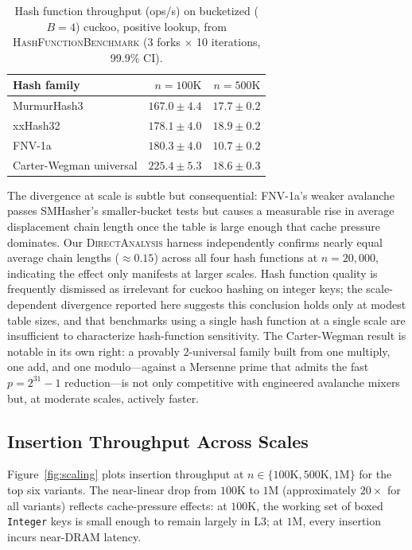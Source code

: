 \documentclass[10pt,journal,compsoc]{IEEEtran}
\begin{document}
\begin{table}[h]
\centering
\caption{Hash function throughput (ops/s) on bucketized ($B=4$) cuckoo, positive lookup, from \textsc{HashFunctionBenchmark} (3 forks $\times$ 10 iterations, 99.9\% CI).}
\label{tab:hashfunc}
\begin{tabular}{@{}lrr@{}}
\toprule
Hash family & $n=100\mathrm{K}$ & $n=500\mathrm{K}$ \\
\midrule
MurmurHash3              & $167.0 \pm 4.4$ & $17.7 \pm 0.2$ \\
xxHash32                 & $178.1 \pm 4.0$ & $18.9 \pm 0.2$ \\
FNV-1a                   & $180.3 \pm 4.0$ & $\mathbf{10.7 \pm 0.2}$ \\
Carter-Wegman universal  & $\mathbf{225.4 \pm 5.3}$ & $18.6 \pm 0.3$ \\
\bottomrule
\end{tabular}
\end{table}

The divergence at scale is subtle but consequential: FNV-1a's weaker avalanche passes SMHasher's smaller-bucket tests but causes a measurable rise in average displacement chain length once the table is large enough that cache pressure dominates. Our \textsc{DirectAnalysis} harness independently confirms nearly equal average chain lengths ($\approx 0.15$) across all four hash functions at $n=20{,}000$, indicating the effect only manifests at larger scales. Hash function quality is frequently dismissed as irrelevant for cuckoo hashing on integer keys; the scale-dependent divergence reported here suggests this conclusion holds only at modest table sizes, and that benchmarks using a single hash function at a single scale are insufficient to characterize hash-function sensitivity. The Carter-Wegman result is notable in its own right: a provably $2$-universal family built from one multiply, one add, and one modulo---against a Mersenne prime that admits the fast $p = 2^{31}{-}1$ reduction---is not only competitive with engineered avalanche mixers but, at moderate scales, actively faster.

\subsection{Insertion Throughput Across Scales}

Figure~\ref{fig:scaling} plots insertion throughput at $n\in\{100\mathrm{K}, 500\mathrm{K}, 1\mathrm{M}\}$ for the top six variants. The near-linear drop from $100\mathrm{K}$ to $1\mathrm{M}$ (approximately $20\times$ for all variants) reflects cache-pressure effects: at $100\mathrm{K}$, the working set of boxed \texttt{Integer} keys is small enough to remain largely in L3; at $1\mathrm{M}$, every insertion incurs near-DRAM latency.
\end{document}
